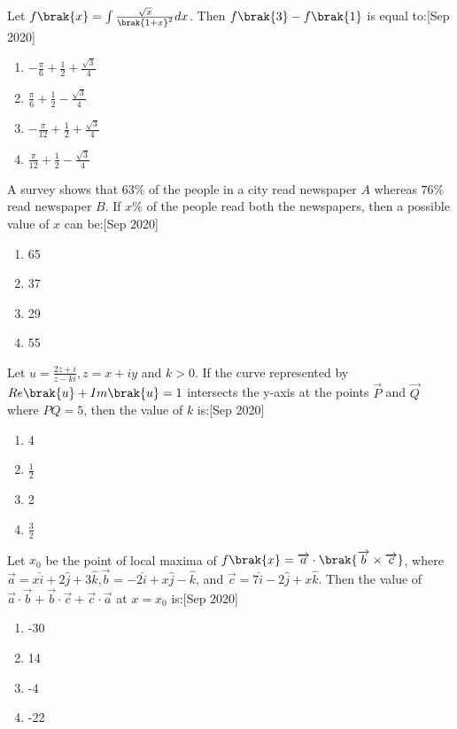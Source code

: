 \item Let $f\brak{x}=\int\frac{\sqrt{x}}{\brak{1+x}^2} dx$. Then $f\brak{3}-f\brak{1}$ is equal to:\hfill{[Sep 2020]}
\begin{enumerate}
    \item $-\frac{\pi}{6}+\frac{1}{2}+\frac{\sqrt{3}}{4}$
    \item $\frac{\pi}{6}+\frac{1}{2}-\frac{\sqrt{3}}{4}$
    \item $-\frac{\pi}{12}+\frac{1}{2}+\frac{\sqrt{3}}{4}$
    \item $\frac{\pi}{12}+\frac{1}{2}-\frac{\sqrt{3}}{4}$
\end{enumerate}
\item A survey shows that $63\%$ of the people in a city read newspaper $ A$ whereas $76\%$ read newspaper $B$. If $x\%$ of the people read both the newspapers, then a possible value of $x$ can be:\hfill{[Sep 2020]}
\begin{enumerate}
\item 65 
\item 37
\item 29
\item 55
\end{enumerate}
\item Let $u=\frac{2z+i}{z-ki},z=x+iy$ and $k>0$. If the curve represented by $Re\brak{u}+Im\brak{u}=1$ intersects the y-axis at the points $\vec{P}$ and $\vec{Q}$ where $PQ=5$, then the value of $k$ is:\hfill{[Sep 2020]}
\begin{enumerate}
    \item 4
    \item $\frac{1}{2}$
    \item 2
    \item $\frac{3}{2}$
\end{enumerate}
\item Let $x_0$ be the point of local maxima of $f\brak{x}=\overrightarrow{a}\cdot\brak{\overrightarrow{b}\times \overrightarrow{c}}$, where $\overrightarrow{a}=x\hat{i}+2\hat{j}+3\hat{k}$,$\overrightarrow{b}=-2\hat{i}+x\hat{j}-\hat{k}$, and $\overrightarrow{c}=7\hat{i}-2\hat{j}+x\hat{k}$. Then the value of $ \overrightarrow{a}\cdot \overrightarrow{b}+\overrightarrow{b}\cdot \overrightarrow{c}+\overrightarrow{c}\cdot \overrightarrow{a}$ at $x=x_0$ is:\hfill{[Sep 2020]}
\begin{enumerate}
    \item -30
    \item 14
    \item -4
    \item -22
\end{enumerate}
